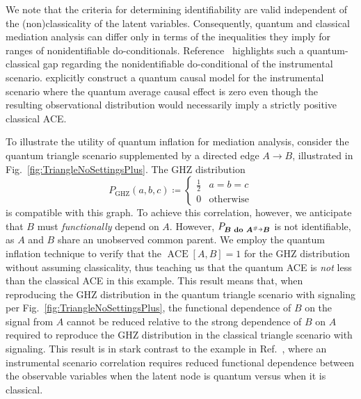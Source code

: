 \documentclass[superscriptaddress,aps,prx,nofootinbib,twocolumn,twoside,reprint,letterpaper,longbibliography]{revtex4-2}
\newcommand{\shortto}[1][3pt]{\mathrel{%
   \hbox{\rule[\dimexpr\fontdimen22\textfont2-.2pt\relax]{#1}{.4pt}}%
   \mkern-4mu\hbox{\usefont{U}{lasy}{m}{n}\symbol{41}}}}
\begin{document}
We note that the criteria for determining identifiability are valid independent of the (non)classicality of the latent variables.
Consequently, quantum and classical mediation analysis can differ only in terms of the inequalities they imply for ranges of nonidentifiable do-conditionals.
Reference~\cite{Chaves2017} highlights such a quantum-classical gap regarding the nonidentifiable do-conditional of the instrumental scenario. \citet{Chaves2017} explicitly construct a quantum causal model for the instrumental scenario where the quantum average causal effect is zero even though the resulting observational distribution would necessarily imply a strictly positive classical ACE.

To illustrate the utility of quantum inflation for mediation analysis, consider the quantum triangle scenario supplemented by a directed edge ${A\to B}$, illustrated in  Fig.~\ref{fig:TriangleNoSettingsPlus}. The GHZ distribution
\begin{equation}
    P_\text{GHZ}(a,b,c)\coloneqq\begin{cases}
        \frac{1}{2} & a{=}b{=}c \\
        0           & \text{otherwise}
    \end{cases}
    \label{GHZdistribution}
\end{equation}
is compatible with this graph. To achieve this correlation, however, we anticipate that $B$ must \emph{functionally} depend on $A$. However, ${P_{\boldsymbol{B}\textbf{ do } \boldsymbol{A}^\#\shortto \boldsymbol{B}}}$ is not identifiable, as $A$ and $B$ share an unobserved common parent. We employ the quantum inflation technique to verify that the ${\operatorname{ACE}[A,B]=1}$ for the GHZ distribution without assuming classicality, thus teaching us that the quantum ACE is \emph{not} less than the classical ACE in this example.
This result means that, when reproducing the GHZ distribution in the quantum triangle scenario with signaling per Fig.~\ref{fig:TriangleNoSettingsPlus}, the functional dependence of $B$ on the signal from $A$ cannot be reduced relative to the strong dependence of $B$ on $A$ required to reproduce the GHZ distribution in the classical triangle scenario with signaling. This result is in stark contrast to the example in Ref.~\cite{Chaves2017}, where an instrumental scenario correlation requires reduced functional dependence between the observable variables when the latent node is quantum versus when it is classical.
\end{document}
